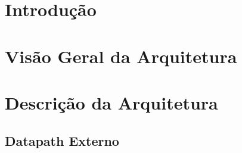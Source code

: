 \documentclass{report}
\begin{document}
\tableofcontents

\chapter{Introdução}
  
	

\chapter{Visão Geral da Arquitetura}

%	
	
	
	
	

\chapter{Descrição da Arquitetura}

	
	\newpage
	
	\newpage
		
	\newpage
	
	\newpage
	\begin{landscape}
	\section{Datapath Externo}
	\begin{figure}[H]
  	\end{figure}
  	\end{landscape}

% 
% 
\end{document}

